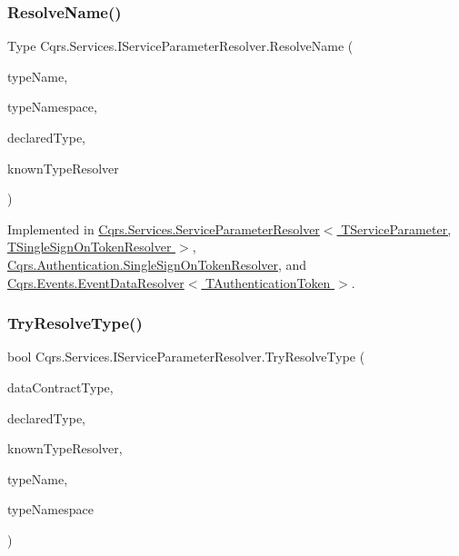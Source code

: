 \subsubsection{\texorpdfstring{Resolve\+Name()}{ResolveName()}}
{\footnotesize\ttfamily Type Cqrs.\+Services.\+I\+Service\+Parameter\+Resolver.\+Resolve\+Name (\begin{DoxyParamCaption}\item[{string}]{type\+Name,  }\item[{string}]{type\+Namespace,  }\item[{Type}]{declared\+Type,  }\item[{Data\+Contract\+Resolver}]{known\+Type\+Resolver }\end{DoxyParamCaption})}



Implemented in \hyperlink{classCqrs_1_1Services_1_1ServiceParameterResolver_a1c668ecde242b87faa85a3dc89d5d974}{Cqrs.\+Services.\+Service\+Parameter\+Resolver$<$ T\+Service\+Parameter, T\+Single\+Sign\+On\+Token\+Resolver $>$}, \hyperlink{classCqrs_1_1Authentication_1_1SingleSignOnTokenResolver_abd546dcdabb00db2e8d0288cbe373895}{Cqrs.\+Authentication.\+Single\+Sign\+On\+Token\+Resolver}, and \hyperlink{classCqrs_1_1Events_1_1EventDataResolver_ade34415acd009dd3f9f3a43169da43e9}{Cqrs.\+Events.\+Event\+Data\+Resolver$<$ T\+Authentication\+Token $>$}.

\mbox{\label{interfaceCqrs_1_1Services_1_1IServiceParameterResolver_a31c82a00b192b877faff6df99e1b689b}} 
\subsubsection{\texorpdfstring{Try\+Resolve\+Type()}{TryResolveType()}}
{\footnotesize\ttfamily bool Cqrs.\+Services.\+I\+Service\+Parameter\+Resolver.\+Try\+Resolve\+Type (\begin{DoxyParamCaption}\item[{Type}]{data\+Contract\+Type,  }\item[{Type}]{declared\+Type,  }\item[{Data\+Contract\+Resolver}]{known\+Type\+Resolver,  }\item[{out Xml\+Dictionary\+String}]{type\+Name,  }\item[{out Xml\+Dictionary\+String}]{type\+Namespace }\end{DoxyParamCaption})}



